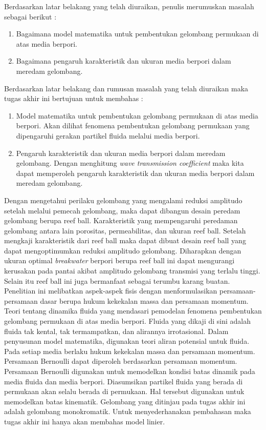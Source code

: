 \noindent Berdasarkan latar belakang yang telah diuraikan, penulis
merumuskan masalah sebagai berikut :
\begin{enumerate}
  \item Bagaimana model matematika untuk pembentukan gelombang
  permukaan di atas media berpori.
  \item Bagaimana pengaruh karakteristik dan ukuran media berpori
  dalam meredam gelombang.
\end{enumerate}


\noindent Berdasarkan latar belakang dan rumusan masalah yang telah
diuraikan maka tugas akhir ini bertujuan untuk membahas :
\begin{enumerate}
  \item Model matematika untuk pembentukan gelombang permukaan di
  atas media berpori. Akan dilihat fenomena pembentukan gelombang permukaan yang dipengaruhi
  gerakan partikel fluida melalui media berpori.
  \item Pengaruh karakteristik dan ukuran media berpori dalam
  meredam gelombang. Dengan menghitung \emph{wave transmission coefficient}
  maka kita dapat memperoleh pengaruh karakteristik dan ukuran media
  berpori dalam meredam gelombang.
\end{enumerate}


\noindent Dengan mengetahui perilaku gelombang yang mengalami
reduksi amplitudo setelah melalui pemecah gelombang, maka dapat
dibangun desain peredam gelombang berupa reef ball. Karakteristik
yang mempengaruhi peredaman gelombang antara lain porositas,
permeabilitas, dan ukuran reef ball. Setelah mengkaji karakteristik
dari reef ball maka dapat dibuat desain reef ball yang dapat
mengoptimumkan reduksi amplitudo gelombang. Diharapkan dengan ukuran
optimal \emph{breakwater} berpori berupa reef ball ini dapat
mengurangi kerusakan pada pantai akibat amplitudo gelombang
transmisi yang terlalu tinggi. Selain itu reef ball ini juga
bermanfaat sebagai
terumbu karang buatan.\\


\noindent Penelitian ini melibatkan aspek-aspek fisis dengan
menformulasikan persamaan-persamaan dasar berupa hukum kekekalan
massa dan persamaan momentum. Teori tentang dinamika fluida yang
mendasari pemodelan fenomena pembentukan gelombang permukaan di atas
media berpori. Fluida yang dikaji di sini adalah fluida tak kental,
tak termampatkan, dan alirannya irrotasional. Dalam penyusunan model
matematika, digunakan teori aliran potensial untuk fluida. Pada
setiap media berlaku hukum kekekalan massa dan persamaan momentum.
Persamaan Bernoulli dapat diperoleh berdasarkan persamaan momentum.
Persamaan Bernoulli digunakan untuk memodelkan kondisi batas dinamik
pada media fluida dan media berpori. Diasumsikan partikel fluida
yang berada di permukaan akan selalu berada di permukaan. Hal
tersebut digunakan untuk memodelkan batas kinematik. Gelombang yang
ditinjau pada tugas akhir ini adalah gelombang monokromatik. Untuk
menyederhanakan
pembahasan maka tugas akhir ini hanya akan membahas model linier.\\

